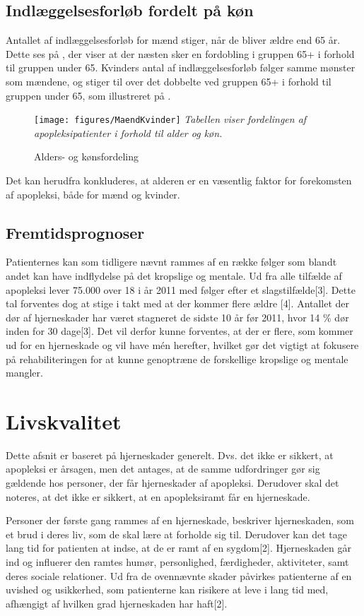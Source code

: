 \subsection{Indlæggelsesforløb fordelt på køn}
Antallet af indlæggelsesforløb for mænd stiger, når de bliver ældre end 65 år. Dette ses på , der viser at der næsten sker en fordobling i gruppen 65+ i forhold til gruppen under 65.
Kvinders antal af indlæggelsesforløb følger samme mønster som mændene, og stiger til over det dobbelte ved gruppen 65+ i forhold til gruppen under 65, som illustreret på .

\begin{figure}[H]
	\caption{Alders- og kønsfordeling}
	\label{AlderKoen}
	\centering
	\texttt{[image: figures/MaendKvinder]}
	\flushleft
	\textit{Tabellen viser fordelingen af apopleksipatienter i forhold til alder og køn.}
\end{figure}

Det kan herudfra konkluderes, at alderen er en væsentlig faktor for forekomsten af apopleksi, både for mænd og kvinder.

\subsection{Fremtidsprognoser}
Patienternes kan som tidligere nævnt rammes af en række følger som blandt andet kan have indflydelse på det kropslige og mentale. Ud fra alle tilfælde af apopleksi lever 75.000 over 18 i år 2011 med følger efter et slagstilfælde[3]. Dette tal forventes dog at stige i takt med at der kommer flere ældre [4]. Antallet der dør af hjerneskader har været stagneret de sidste 10 år før 2011, hvor 14 \% dør inden for 30 dage[3]. Det vil derfor kunne forventes, at der er flere, som kommer ud for en hjerneskade og vil have mén herefter, hvilket gør det vigtigt at fokusere på rehabiliteringen for at kunne genoptræne de forskellige kropslige og mentale mangler.

\section{Livskvalitet}
Dette afsnit er baseret på hjerneskader generelt. Dvs. det ikke er sikkert, at apopleksi er årsagen, men det antages, at de samme udfordringer gør sig gældende hos personer, der får hjerneskader af apopleksi. Derudover skal det noteres, at det ikke er sikkert, at en apopleksiramt får en hjerneskade. 

Personer der første gang rammes af en hjerneskade, beskriver hjerneskaden, som et brud i deres liv, som de skal lære at forholde sig til. Derudover kan det tage lang tid for patienten at indse, at de er ramt af en sygdom[2]. 
Hjerneskaden går ind og influerer den ramtes humør, personlighed, færdigheder, aktiviteter, samt deres sociale relationer. Ud fra de ovennævnte skader påvirkes patienterne af  en uvished og usikkerhed, som patienterne kan risikere at leve i lang tid med, afhængigt af hvilken grad hjerneskaden har haft[2]. 

